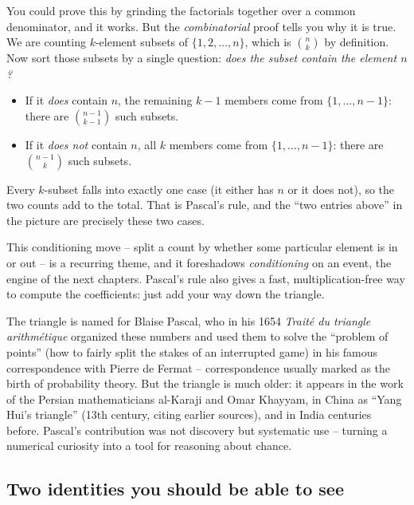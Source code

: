 \begin{whybox}
You could prove this by grinding the factorials together over a common denominator, and it
works. But the \emph{combinatorial} proof tells you why it is true. We are counting
$k$-element subsets of $\{1,2,\dots,n\}$, which is $\binom{n}{k}$ by definition. Now sort
those subsets by a single question: \emph{does the subset contain the element $n$?}
\begin{itemize}
  \item If it \emph{does} contain $n$, the remaining $k-1$ members come from $\{1,\dots,n-1\}$:
        there are $\binom{n-1}{k-1}$ such subsets.
  \item If it \emph{does not} contain $n$, all $k$ members come from $\{1,\dots,n-1\}$:
        there are $\binom{n-1}{k}$ such subsets.
\end{itemize}
Every $k$-subset falls into exactly one case (it either has $n$ or it does not), so the two
counts add to the total. That is Pascal's rule, and the ``two entries above'' in the
picture are precisely these two cases.
\end{whybox}

This conditioning move -- split a count by whether some particular element is in or out -- is
a recurring theme, and it foreshadows \emph{conditioning} on an event, the engine of the
next chapters. Pascal's rule also gives a fast, multiplication-free way to compute the
coefficients: just add your way down the triangle.

\begin{historybox}
The triangle is named for Blaise Pascal, who in his 1654 \emph{Trait\'e du triangle
arithm\'etique} organized these numbers and used them to solve the ``problem of points'' (how
to fairly split the stakes of an interrupted game) in his famous correspondence with Pierre
de Fermat -- correspondence usually marked as the birth of probability theory. But the
triangle is much older: it appears in the work of the Persian mathematicians al-Karaji and
Omar Khayyam, in China as ``Yang Hui's triangle'' (13th century, citing earlier sources),
and in India centuries before. Pascal's contribution was not discovery but systematic use --
turning a numerical curiosity into a tool for reasoning about chance.
\end{historybox}

\subsection{Two identities you should be able to see}

